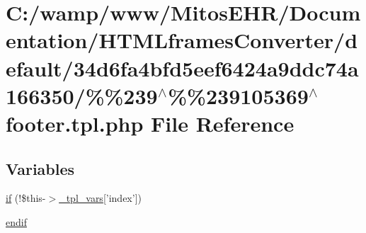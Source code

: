 \hypertarget{default_234d6fa4bfd5eef6424a9ddc74a166350_2_06_06239_05_06_06239105369_05footer_8tpl_8php}{\section{\-C\-:/wamp/www/\-Mitos\-E\-H\-R/\-Documentation/\-H\-T\-M\-Lframes\-Converter/default/34d6fa4bfd5eef6424a9ddc74a166350/\%\%239$^\wedge$\%\%239105369$^\wedge$footer.tpl.\-php \-File \-Reference}
\label{default_234d6fa4bfd5eef6424a9ddc74a166350_2_06_06239_05_06_06239105369_05footer_8tpl_8php}
}
\subsection*{\-Variables}
\begin{DoxyCompactItemize}
\item 
\hyperlink{default_234d6fa4bfd5eef6424a9ddc74a166350_2_06_06239_05_06_06239105369_05footer_8tpl_8php_ac88ce6836416eb9d767d617090a64744}{if} (!\$this-\/$>$\hyperlink{_06_06127_05_06_0612781687_05pkgelementindex_8tpl_8php_a4a4846d8e68d455590131a05697f67a3}{\-\_\-tpl\-\_\-vars}\mbox{[}'index'\mbox{]})
\item 
\hyperlink{default_234d6fa4bfd5eef6424a9ddc74a166350_2_06_06239_05_06_06239105369_05footer_8tpl_8php_a82cd33ca97ff99f2fcc5e9c81d65251b}{endif}
\end{DoxyCompactItemize}


